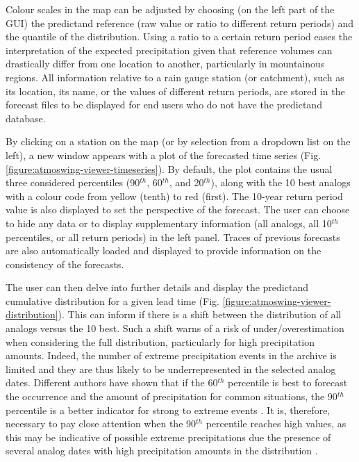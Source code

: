 \documentclass[gmdd]{copernicus}
\begin{document}
Colour scales in the map can be adjusted by choosing (on the left part of the GUI) the predictand reference (raw value or ratio to different return periods) and the quantile of the distribution. Using a ratio to a certain return period eases the interpretation of the expected precipitation given that reference volumes can drastically differ from one location to another, particularly in mountainous regions. All information relative to a rain gauge station (or catchment), such as its location, its name, or the values of different return periods, are stored in the forecast files to be displayed for end users who do not have the predictand database.

By clicking on a station on the map (or by selection from a dropdown list on the left), a new window appears with a plot of the forecasted time series (Fig. \ref{figure:atmoswing-viewer-timeseries}). By default, the plot contains the usual three considered percentiles (90$^{th}$, 60$^{th}$, and 20$^{th}$), along with the 10 best analogs with a colour code from yellow (tenth) to red (first). The 10-year return period value is also displayed to set the perspective of the forecast. The user can choose to hide any data or to display supplementary information (all analogs, all 10$^{th}$ percentiles, or all return periods) in the left panel. Traces of previous forecasts are also automatically loaded and displayed to provide information on the consistency of the forecasts. 

The user can then delve into further details and display the predictand cumulative distribution for a given lead time (Fig. \ref{figure:atmoswing-viewer-distribution}). This can inform if there is a shift between the distribution of all analogs versus the 10 best. Such a shift warns of a risk of under/overestimation when considering the full distribution, particularly for high precipitation amounts. Indeed, the number of extreme precipitation events in the archive is limited and they are thus likely to be underrepresented in the selected analog dates. Different authors have shown that if the 60$^{th}$ percentile is best to forecast the occurrence and the amount of precipitation for common situations, the 90$^{th}$ percentile is a better indicator for strong to extreme events \citep{Djerboua2001, Bontron2004, Marty2010}. It is, therefore, necessary to pay close attention when the 90$^{th}$ percentile reaches high values, as this may be indicative of possible extreme precipitations due the presence of several analog dates with high precipitation amounts in the distribution \citep{Djerboua2001}.
\end{document}

